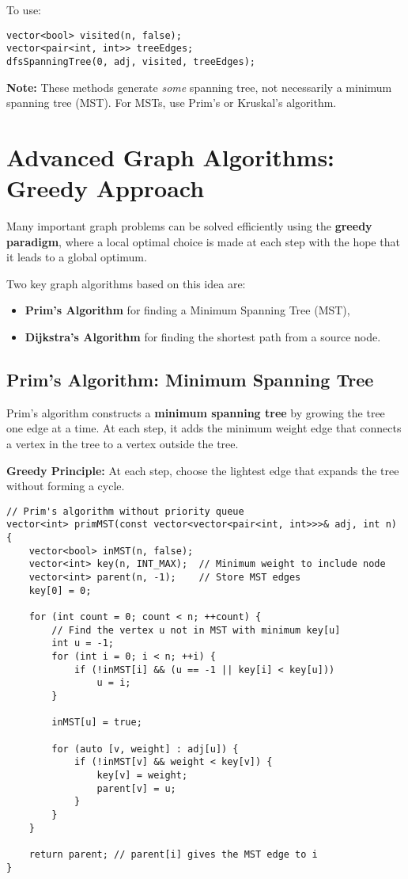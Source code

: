 \documentclass{article}
\begin{document}
To use:
\begin{lstlisting}[style=cppstyle]
vector<bool> visited(n, false);
vector<pair<int, int>> treeEdges;
dfsSpanningTree(0, adj, visited, treeEdges);
\end{lstlisting}

\textbf{Note:} These methods generate \textit{some} spanning tree, not necessarily a minimum spanning tree (MST). For MSTs, use Prim’s or Kruskal’s algorithm.

\section{Advanced Graph Algorithms: Greedy Approach}

Many important graph problems can be solved efficiently using the \textbf{greedy paradigm}, where a local optimal choice is made at each step with the hope that it leads to a global optimum.

Two key graph algorithms based on this idea are:
\begin{itemize}
    \item \textbf{Prim’s Algorithm} for finding a Minimum Spanning Tree (MST),
    \item \textbf{Dijkstra’s Algorithm} for finding the shortest path from a source node.
\end{itemize}

\subsection{Prim’s Algorithm: Minimum Spanning Tree}

Prim’s algorithm constructs a \textbf{minimum spanning tree} by growing the tree one edge at a time. At each step, it adds the minimum weight edge that connects a vertex in the tree to a vertex outside the tree.

\textbf{Greedy Principle:} At each step, choose the lightest edge that expands the tree without forming a cycle.

\begin{lstlisting}[style=cppstyle]
// Prim's algorithm without priority queue
vector<int> primMST(const vector<vector<pair<int, int>>>& adj, int n) {
    vector<bool> inMST(n, false);
    vector<int> key(n, INT_MAX);  // Minimum weight to include node
    vector<int> parent(n, -1);    // Store MST edges
    key[0] = 0;

    for (int count = 0; count < n; ++count) {
        // Find the vertex u not in MST with minimum key[u]
        int u = -1;
        for (int i = 0; i < n; ++i) {
            if (!inMST[i] && (u == -1 || key[i] < key[u]))
                u = i;
        }

        inMST[u] = true;

        for (auto [v, weight] : adj[u]) {
            if (!inMST[v] && weight < key[v]) {
                key[v] = weight;
                parent[v] = u;
            }
        }
    }

    return parent; // parent[i] gives the MST edge to i
}
\end{lstlisting}
\end{document}
